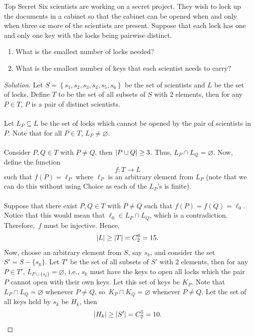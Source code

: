 \documentclass[math]{amznotes}
\newenvironment{solution}
    {\let\oldqedsymbol=\qedsymbol
    \renewcommand{\qedsymbol}{\ }
    \begin{proof}[Solution]
    }
    {\end{proof}
    \renewcommand{\qedsymbol}{\oldqedsymbol}
    }
\theoremstyle{remark}
\begin{document}
\begin{exbox}{Top Secret}{}
    Six scientists are working on a secret project. They wish to lock up the documents in a cabinet so that the cabinet can be opened when and only when three or more of the scientists are present. Suppose that each lock has one and only one key with the locks being pairwise distinct.
    \begin{enumerate}
        \item What is the smallest number of locks needed?
        \item What is the smallest number of keys that each scientist needs to carry?
    \end{enumerate}
    \tcblower   
    \begin{solution}
        Let $S = \left\{s_1, s_2, s_3, s_4, s_5, s_6\right\}$ be the set of scientists and $L$ be the set of locks. Define $T$ to be the set of all subsets of $S$ with $2$ elements, then for any $P \in T$, $P$ is a pair of distinct scientists.
        \\\\
        Let $L_P \subseteq L$ be the set of locks which cannot be opened by the pair of scientists in $P$. Note that for all $P \in T$, $L_P \neq \varnothing$. 
        \\\\
        Consider $P, Q \in T$ with $P \neq Q$, then ${\left\lvert {P \cup Q} \right\rvert} \geq 3$. Thus, $L_P \cap L_Q = \varnothing$. Now, define the function
        \begin{displaymath}
            f \colon T \to L
        \end{displaymath}
        such that $f(P) = \ell_P$ where $\ell_P$ is an arbitrary element from $L_P$ (note that we can do this without using Choice as each of the $L_P$'s is finite).
        \\\\
        Suppose that there exist $P, Q \in T$ with $P \neq Q$ such that $f(P) = f(Q) = \ell_0$. Notice that this would mean that $\ell_0 \in L_P \cap L_Q$, which is a contradiction. Therefore,~$f$ must be injective. Hence, 
        \begin{equation*}
            {\left\lvert {L} \right\rvert} \geq {\left\lvert {T} \right\rvert} = C^6_2 = 15.
        \end{equation*}
        Now, choose an arbitrary element from $S$, say $s_k$, and consider the set $S' = S - \{s_k\}$. Let $T'$ be the set of all subsets of $S'$ with $2$ elements, then for any $P \in T'$, $L_{P \cup \{s_k\}} = \varnothing$, i.e., $s_k$ must have the keys to open all locks which the pair $P$ cannot open with their own keys. Let this set of keys be $K_P$. Note that $L_P \cap L_Q = \varnothing$ whenever $P \neq Q$, so~$K_P \cap K_Q = \varnothing$ whenever $P \neq Q$. Let the set of all keys held by $s_k$ be $H_k$, then
        \begin{equation*}
            {\left\lvert {H_k} \right\rvert} \geq {\left\lvert {S'} \right\rvert} = C^5_2 = 10.
        \end{equation*}
    \end{solution}
\end{exbox}
\end{document}
